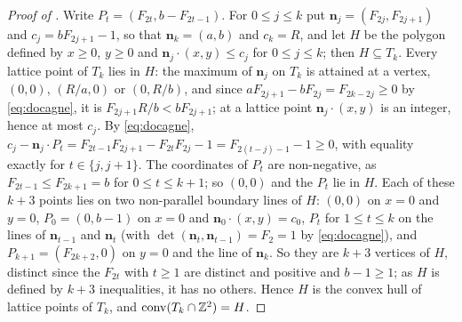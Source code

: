 \begin{proof}[Proof of ]
Write $P_t=(F_{2t},b-F_{2t-1})$.
For $0\le j\le k$ put $\mathbf n_j=(F_{2j},F_{2j+1})$ and $c_j=bF_{2j+1}-1$, so that $\mathbf n_k=(a,b)$ and $c_k=R$, and let $H$ be the polygon defined by $x\ge0$, $y\ge0$ and $\mathbf n_j\cdot(x,y)\le c_j$ for $0\le j\le k$; then $H\subseteq T_k$.
Every lattice point of $T_k$ lies in $H$: the maximum of $\mathbf n_j$ on $T_k$ is attained at a vertex, $(0,0)$, $(R/a,0)$ or $(0,R/b)$, and since $aF_{2j+1}-bF_{2j}=F_{2k-2j}\ge0$ by \eqref{eq:docagne}, it is $F_{2j+1}R/b<bF_{2j+1}$; at a lattice point $\mathbf n_j\cdot(x,y)$ is an integer, hence at most $c_j$.
By \eqref{eq:docagne}, $c_j-\mathbf n_j\cdot P_t=F_{2t-1}F_{2j+1}-F_{2t}F_{2j}-1=F_{2(t-j)-1}-1\ge0$, with equality exactly for $t\in\{j,j+1\}$.
The coordinates of $P_t$ are non-negative, as $F_{2t-1}\le F_{2k+1}=b$ for $0\le t\le k+1$; so $(0,0)$ and the $P_t$ lie in $H$.
Each of these $k+3$ points lies on two non-parallel boundary lines of $H$: $(0,0)$ on $x=0$ and $y=0$, $P_0=(0,b-1)$ on $x=0$ and $\mathbf n_0\cdot(x,y)=c_0$, $P_t$ for $1\le t\le k$ on the lines of $\mathbf n_{t-1}$ and $\mathbf n_t$ (with $\det(\mathbf n_t,\mathbf n_{t-1})=F_2=1$ by \eqref{eq:docagne}), and $P_{k+1}=(F_{2k+2},0)$ on $y=0$ and the line of $\mathbf n_k$.
So they are $k+3$ vertices of $H$, distinct since the $F_{2t}$ with $t\ge1$ are distinct and positive and $b-1\ge1$; as $H$ is defined by $k+3$ inequalities, it has no others.
Hence $H$ is the convex hull of lattice points of $T_k$, and $\operatorname{conv}(T_k\cap\mathbb{Z}^2)=H$.
\end{proof}
